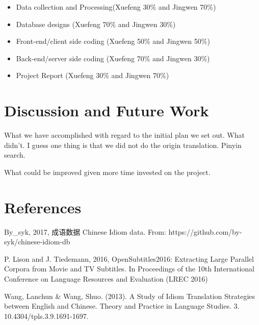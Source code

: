 \documentclass[11pt]{article} %
\begin{document}
\begin{itemize}
	\item Data collection and Processing(Xuefeng 30\% and Jingwen 70\%)
    \item Database designs (Xuefeng 70\% and Jingwen 30\%)
    \item Front-end/client side coding (Xuefeng 50\% and Jingwen 50\%)
    \item Back-end/server side coding (Xuefeng 70\% and Jingwen 30\%)
    \item Project Report (Xuefeng 30\% and Jingwen 70\%)
\end{itemize}

\section{Discussion and Future Work}
\indent What we have accomplished with regard to the initial plan we set out. What didn't. I guess one thing is that we did not do the origin translation. Pinyin search.

\indent What could be improved given more time invested on the project. 



\section{References}

By\_syk, 2017, 成语数据 Chinese Idiom data. From: https://github.com/by-syk/chinese-idiom-db

P. Lison and J. Tiedemann, 2016, OpenSubtitles2016: Extracting Large Parallel Corpora from Movie and TV Subtitles. In Proceedings of the 10th International Conference on Language Resources and Evaluation (LREC 2016)

Wang, Lanchun \& Wang, Shuo. (2013). A Study of Idiom Translation Strategies between English and Chinese. Theory and Practice in Language Studies. 3. 10.4304/tpls.3.9.1691-1697. 
\end{document}
